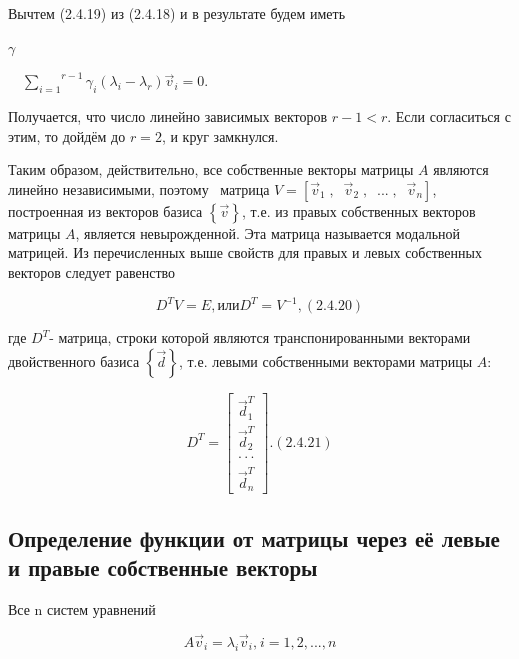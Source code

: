 		Вычтем (2.4.19) из (2.4.18) и в результате будем иметь

$ \gamma $

		\ \  $\overset{r-1}{\underset{i=1}{\sum }}\gamma_i(\lambda _i-\lambda _r)\vec v_i=0$.



		Получается, что число линейно зависимых векторов  $r-1<r$. Если согласиться с этим, то дойдём до  $r=2$, и круг
		замкнулся.



		Таким образом, действительно, все собственные векторы матрицы  $A$ являются линейно независимыми, поэтому \ матрица 
		$V=\left[\vec v_1\;,\;\;\vec v_2\;,\;\;...\;,\;\;\vec v_n\right]$, построенная из векторов базиса  $\left\{\vec
		v\right\}$, т.е. из правых собственных векторов матрицы $A$, является невырожденной. Эта матрица называется модальной
		матрицей. Из перечисленных выше свойств для правых и левых собственных векторов следует равенство



		\begin{equation}\label{key}
			D^TV=E, или  D^T=V^{-1}, (2.4.20)
		\end{equation}



		где  $D^T$- матрица, строки которой являются транспонированными векторами двойственного базиса  $\left\{\vec d\right\}$,
		т.е. левыми собственными векторами матрицы  $A$:



\begin{equation}\label{key}
	D^T=\left[
	\begin{matrix}
	\vec d_1^T\\\vec d_2^T\\\cdot \cdot \cdot \\\vec
	d_n^T
	\end{matrix}
	\right].  (2.4.21)
\end{equation}



\bigskip

\subsection{Определение функции от матрицы через её левые и правые собственные векторы}

\bigskip


		Все n систем уравнений


\begin{equation*}
A\vec v_i=\lambda _i\vec v_i,_{}^{}i=1,2,...,n
\end{equation*}

